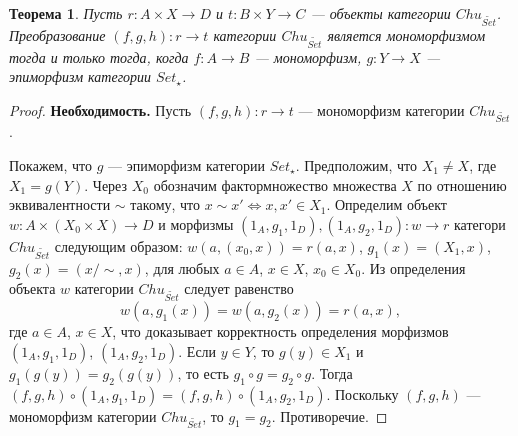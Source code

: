 \documentclass[a4paper,12pt]{article}
\newtheorem{theorem}{Теорема}
\begin{document}
\begin{theorem}\label{monomorphism}
    Пусть $r: A \times X \to D$ и $t: B \times Y \to C$ --- объекты категории $Chu_{\widetilde{Set}}$. Преобразование $(f,g,h): r \to t$ категории $Chu_{\widetilde{Set}}$ является мономорфизмом тогда и только тогда, когда $f: A \to B$ --- мономорфизм, $g: Y \to X$ --- эпиморфизм категории $Set_{\star}$.
\end{theorem}
\begin{proof}
    \textbf{Необходимость.} Пусть $(f,g,h): r \to t$ --- мономорфизм категории $Chu_{\widetilde{Set}}$.

    Покажем, что $g$ --- эпиморфизм категории $Set_{\star}$. Предположим, что $X_1 \ne X$, где $X_1 = g(Y)$. Через $X_0$ обозначим фактормножество множества $X$ по отношению эквивалентности $\sim$ такому, что $x \sim x' \Leftrightarrow x,x' \in X_1$. Определим объект $w: A \times (X_0 \times X) \to D$ и морфизмы $(1_A,g_1,1_D), (1_A,g_2,1_D): w \to r$ категори $Chu_{\widetilde{Set}}$ следующим образом: $w(a,(x_0,x)) = r(a,x)$, $g_1(x) = (X_1,x)$, $g_2(x) = (x/\sim, x)$, для любых $a \in A$, $x \in X$, $x_0 \in X_0$. Из определения объекта $w$ категории $Chu_{\widetilde{Set}}$ следует равенство
    $$
        w(a,g_1(x)) = w(a,g_2(x)) = r(a,x),
    $$ 
    где $a \in A$, $x \in X$, что доказывает корректность определения морфизмов $(1_A,g_1,1_D)$, $(1_A,g_2,1_D)$. Если $y \in Y$, то $g(y) \in X_1$ и $g_1(g(y)) = g_2(g(y))$, то есть $g_1 \circ g = g_2 \circ g$. Тогда $(f,g,h) \circ (1_A,g_1,1_D) = (f,g,h) \circ (1_A,g_2,1_D)$. Поскольку $(f,g,h)$ --- мономорфизм категории $Chu_{\widetilde{Set}}$, то $g_1 = g_2$. Противоречие.


\end{proof}
\end{document}
